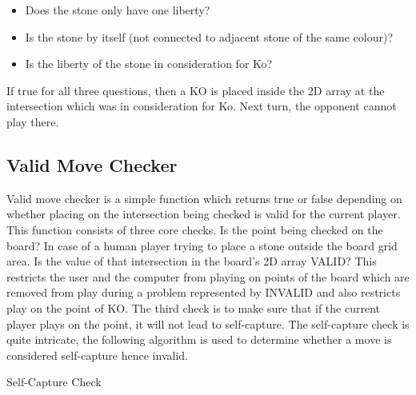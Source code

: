 \documentclass{l4proj}
\begin{document}
\begin{itemize}
    \item Does the stone only have one liberty?
    \item Is the stone by itself (not connected to adjacent stone of the same colour)?
    \item Is the liberty of the stone in consideration for Ko?
\end{itemize}

If true for all three questions, then a KO is placed inside the 2D array at the intersection which was in consideration for Ko. Next turn, the opponent cannot play there.

\subsection{Valid Move Checker}
Valid move checker is a simple function which returns true or false depending on whether placing on the intersection being checked is valid for the current player. This function consists of three core checks. Is the point being checked on the board? In case of a human player trying to place a stone outside the board grid area. Is the value of that intersection in the board’s 2D array VALID? This restricts the user and the computer from playing on points of the board which are removed from play during a problem represented by INVALID and also restricts play on the point of KO. The third check is to make sure that if the current player plays on the point, it will not lead to self-capture. The self-capture check is quite intricate, the following algorithm is used to determine whether a move is considered self-capture hence invalid.

\begin{algorithm}[H]
\caption{Self-Capture Check}\label{Self-Capture Check}
    \DontPrintSemicolon
\end{algorithm}
\end{document}
